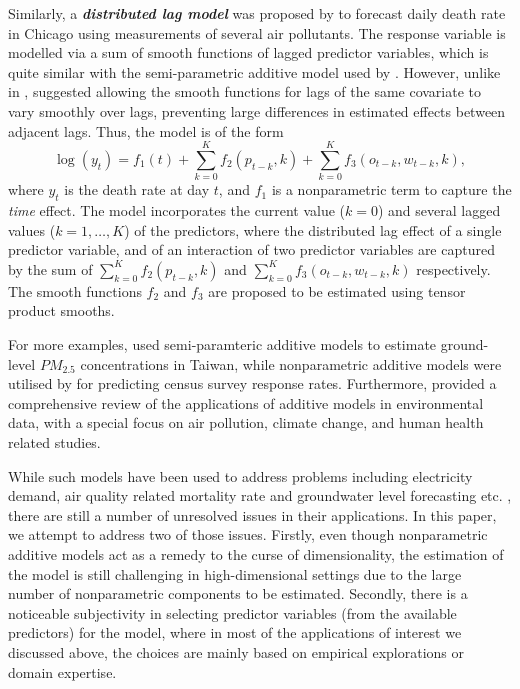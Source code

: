 \documentclass[11pt,a4paper,]{article}
\begin{document}
Similarly, a \textbf{\emph{distributed lag model}} was proposed by
\textcite{Wood2017} to forecast daily death rate in Chicago using
measurements of several air pollutants. The response variable is
modelled via a sum of smooth functions of lagged predictor variables,
which is quite similar with the semi-parametric additive model used by
\textcite{FH2012}. However, unlike in \textcite{FH2012},
\textcite{Wood2017} suggested allowing the smooth functions for lags of
the same covariate to vary smoothly over lags, preventing large
differences in estimated effects between adjacent lags. Thus, the model
is of the form \[
 \log(y_{t}) = f_{1}(t) + \sum_{k=0}^{K} f_{2}(p_{t-k}, k) + \sum_{k=0}^{K} f_{3}(o_{t-k}, w_{t-k}, k),
\] where \(y_{t}\) is the death rate at day \(t\), and \(f_{1}\) is a
nonparametric term to capture the \emph{time} effect. The model
incorporates the current value (\(k = 0\)) and several lagged values
(\(k = 1, \dots, K\)) of the predictors, where the distributed lag
effect of a single predictor variable, and of an interaction of two
predictor variables are captured by the sum of
\(\sum_{k=0}^{K} f_{2}(p_{t-k}, k)\) and
\(\sum_{k=0}^{K} f_{3}(o_{t-k}, w_{t-k}, k)\) respectively. The smooth
functions \(f_{2}\) and \(f_{3}\) are proposed to be estimated using
tensor product smooths.

For more examples, \textcite{Ho2020} used semi-paramteric additive
models to estimate ground-level \(PM_{2.5}\) concentrations in Taiwan,
while nonparametric additive models were utilised by
\textcite{Ibrahim2021} for predicting census survey response rates.
Furthermore, \textcite{Ravindra2019} provided a comprehensive review of
the applications of additive models in environmental data, with a
special focus on air pollution, climate change, and human health related
studies.

While such models have been used to address problems including
electricity demand, air quality related mortality rate and groundwater
level forecasting etc.
\autocite{FH2012,HF2010,Wood2017,Peterson2014,Rajaee2019}, there are
still a number of unresolved issues in their applications. In this
paper, we attempt to address two of those issues. Firstly, even though
nonparametric additive models act as a remedy to the curse of
dimensionality, the estimation of the model is still challenging in
high-dimensional settings due to the large number of nonparametric
components to be estimated. Secondly, there is a noticeable subjectivity
in selecting predictor variables (from the available predictors) for the
model, where in most of the applications of interest we discussed above,
the choices are mainly based on empirical explorations or domain
expertise.
\end{document}
